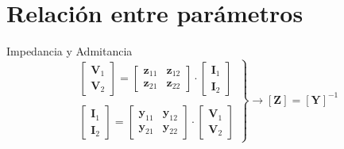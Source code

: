 \documentclass[xcolor={usenames,svgnames,dvipsnames}]{beamer}
\begin{document}
\section{Relación entre parámetros}
\label{sec:org28f423d}

\begin{frame}[label={sec:orgdd994e7}]{Impedancia y Admitancia}
\[
  \left.
    \begin{array}{l}
      \left[
      \begin{array}{c}
        \mathbf{V}_1\\
        \mathbf{V}_2
      \end{array}
      \right] =
      \left[
      \begin{array}{cc}
        \mathbf{z}_{11} & \mathbf{z}_{12}\\
        \mathbf{z}_{21} & \mathbf{z}_{22}
      \end{array}
                          \right]
                          \cdot
                          \left[
                          \begin{array}{c}
                            \mathbf{I}_1\\
                            \mathbf{I}_2
                          \end{array}
      \right] \\ \\
      \left[
      \begin{array}{c}
        \mathbf{I}_1\\
        \mathbf{I}_2
      \end{array}
      \right] =
      \left[
      \begin{array}{cc}
        \mathbf{y}_{11} & \mathbf{y}_{12}\\
        \mathbf{y}_{21} & \mathbf{y}_{22}
      \end{array}
                          \right] \cdot
                          \left[
                          \begin{array}{c}
                            \mathbf{V}_1\\
                            \mathbf{V}_2
                          \end{array}
      \right]
    \end{array}
    \right\}
      \rightarrow
      \boxed{[\mathbf{Z}] = [\mathbf{Y}]^{-1}}
    \]
\end{frame}
\end{document}
